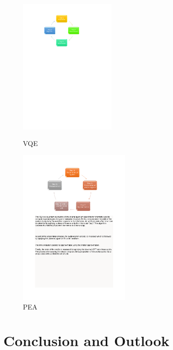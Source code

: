 \documentclass[14pt,landscape,color=UCLdarkred,margin=3cm]{uclposter}
\begin{document}
\begin{multicols}{3}
\begin{figure}[H]
  \begin{center}
  \begin{minipage}[c]{13em}
    \includegraphics[width=13em]{VQEdiagram.pdf}
    \caption{VQE}
  \end{minipage}
  \qquad
  \begin{minipage}[c]{15em}
    \includegraphics[width=15em]{PEA.pdf}
    \caption{PEA}
  \end{minipage}
  \end{center}

   
\end{figure}



\section*{Conclusion and Outlook}




\end{multicols}
\end{document}
